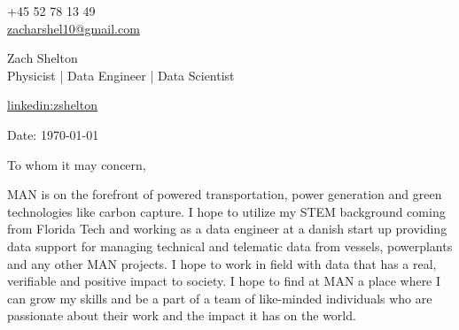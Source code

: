 \documentclass[11pt,a4]{article}
\begin{document}
\begin{center}
    \begin{minipage}[b]{0.24\textwidth}
            \large +45 52 78 13 49 \\
            \large \href{mailto:zacharshel10@gmail.com}{zacharshel10@gmail.com} 
    \end{minipage}%
    \begin{minipage}[b]{0.5\textwidth}
            \centering
            {\Huge Zach Shelton} \\ %
            \vspace{0.1cm}
            {\color{UI_blue} \Large{Physicist | Data Engineer | Data Scientist}} \\
    \end{minipage}%
    \begin{minipage}[b]{0.24\textwidth}
            \flushright \large
            {\href{https://www.linkedin.com/in/zshelton/}{linkedin:zshelton} } \\
    \end{minipage}   
    
\vspace{-0.15cm} 
{\color{UI_blue} \hrulefill}
\end{center}

\justify
\setlength{\parindent}{0pt}
\setlength{\parskip}{12pt}
\vspace{0.1cm}


Date: \today \par \vspace{-0.1cm}

To whom it may concern,

MAN is on the forefront of powered transportation, power generation and green technologies like carbon capture. I hope to utilize my STEM background coming from Florida Tech and working as a data engineer at a danish start up providing data support for managing technical and telematic data from vessels, powerplants and any other MAN projects. I hope to work in field with data that has a real, verifiable and positive impact to society. I hope to find at MAN a place where I can grow my skills and be a part of a team of like-minded individuals who are passionate about their work and the impact it has on the world. 
\end{document}
